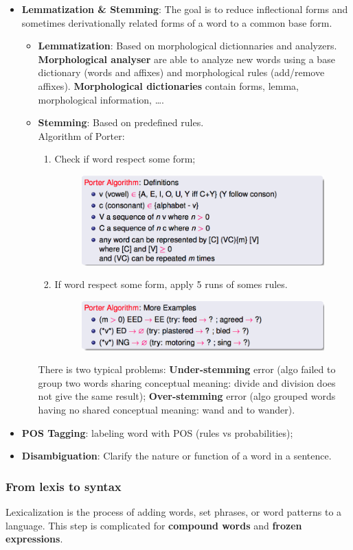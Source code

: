 \begin{itemize}
	\item \textbf{Lemmatization \& Stemming}: The goal is to reduce inflectional forms and sometimes derivationally related forms of a word to a common base form.
	\begin{itemize}
		\item \textbf{Lemmatization}: Based on morphological dictionnaries and analyzers. \textbf{Morphological analyser}  are able to analyze new words using a base dictionary (words and affixes) and morphological rules (add/remove affixes). \textbf{Morphological dictionaries} contain forms, lemma, morphological information, \dots.
		\item \textbf{Stemming}: Based on predefined rules.\\
		Algorithm of Porter: 
		\begin{enumerate}
			\item Check if word respect some form;
			\begin{figure}[htp]
				\centering
				\includegraphics[scale=0.4]{images/05_form.png}
			\end{figure}
			\item If word respect some form, apply 5 runs of somes rules.
			\begin{figure}[htp]
				\centering
				\includegraphics[scale=0.4]{images/06_rule.png}
			\end{figure}
		\end{enumerate}
		There is two typical problems: \textbf{Under-stemming} error (algo failed to group two words sharing conceptual meaning: divide and division does not give the same result); \textbf{Over-stemming} error (algo grouped words having no shared conceptual meaning: wand and to wander).
	\end{itemize}
	\item \textbf{POS Tagging}: labeling word with POS (rules vs probabilities);
	\item \textbf{Disambiguation}: Clarify the nature or function of a word in a sentence.
\end{itemize}


\subsubsection{From lexis to syntax}

Lexicalization is the process of adding words, set phrases, or word patterns to a language. This step is complicated for \textbf{compound words} and \textbf{frozen expressions}.